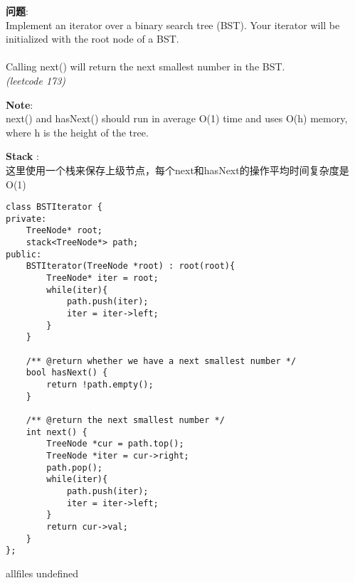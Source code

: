 \documentclass{article}
\begin{document}
\begin{CJK}{UTF8}{gbsn}     %

\else
    
\begin{description}
    \item{\textbf{问题}}: \\
Implement an iterator over a binary search tree (BST). Your iterator will be initialized with the root node of a BST. \\
\\
Calling next() will return the next smallest number in the BST. \\
\textit{(leetcode 173)}
    \item{\textbf{Note}}: \\
next() and hasNext() should run in average O(1) time and uses O(h) memory, where h is the height of the tree.
    \item{\textbf{Stack}} : 
    \\这里使用一个栈来保存上级节点，每个next和hasNext的操作平均时间复杂度是O(1)
    \begin{lstlisting}
class BSTIterator {
private:
	TreeNode* root;
	stack<TreeNode*> path;
public:
    BSTIterator(TreeNode *root) : root(root){
		TreeNode* iter = root;
		while(iter){
			path.push(iter);
			iter = iter->left;
		}
    }

    /** @return whether we have a next smallest number */
    bool hasNext() {
		return !path.empty();
    }

    /** @return the next smallest number */
    int next() {
        TreeNode *cur = path.top();
		TreeNode *iter = cur->right;
		path.pop();
		while(iter){
			path.push(iter);
			iter = iter->left;
		}
		return cur->val;
    }
};
    \end{lstlisting}
\end{description}

\fi

\ifx allfiles undefined
\end{CJK}
\end{document}
